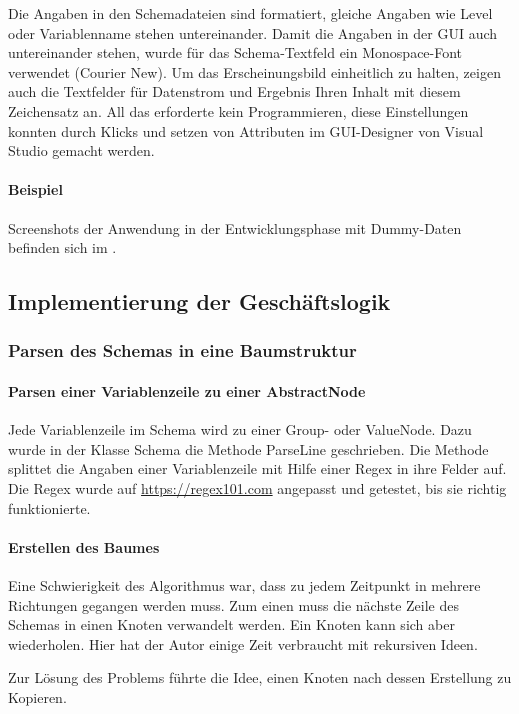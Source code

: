 Die Angaben in den Schemadateien sind formatiert, gleiche Angaben wie Level oder Variablenname stehen untereinander. Damit die Angaben in der GUI auch untereinander stehen, wurde für das Schema-Textfeld ein Monospace-Font verwendet (Courier New). Um das Erscheinungsbild einheitlich zu halten, zeigen auch die Textfelder für Datenstrom und Ergebnis Ihren Inhalt mit diesem Zeichensatz an.
All das erforderte kein Programmieren, diese Einstellungen konnten durch Klicks und setzen von Attributen im GUI-Designer von Visual Studio gemacht werden.
\paragraph{Beispiel}
Screenshots der Anwendung in der Entwicklungsphase mit Dummy-Daten befinden sich im .


\subsection{Implementierung der Geschäftslogik}
\label{sec:ImplementierungGeschaeftslogik}
\subsubsection{Parsen des Schemas in eine Baumstruktur}
\paragraph{Parsen einer Variablenzeile zu einer AbstractNode}
Jede Variablenzeile im Schema wird zu einer Group- oder ValueNode. Dazu wurde in der Klasse Schema die Methode ParseLine geschrieben. Die Methode splittet die Angaben einer Variablenzeile mit Hilfe einer \ac{Regex} in ihre Felder auf. Die \ac{Regex} wurde auf \href{https://regex101.com}{https://regex101.com} angepasst und getestet, bis sie richtig funktionierte.

\paragraph{Erstellen des Baumes}

Eine Schwierigkeit des Algorithmus war, dass zu jedem Zeitpunkt in mehrere Richtungen gegangen werden muss. Zum einen muss die nächste Zeile des Schemas in einen Knoten verwandelt werden. Ein Knoten kann sich aber wiederholen.
Hier hat der Autor einige Zeit verbraucht mit rekursiven Ideen.

Zur Lösung des Problems führte die Idee, einen Knoten nach dessen Erstellung zu Kopieren.

